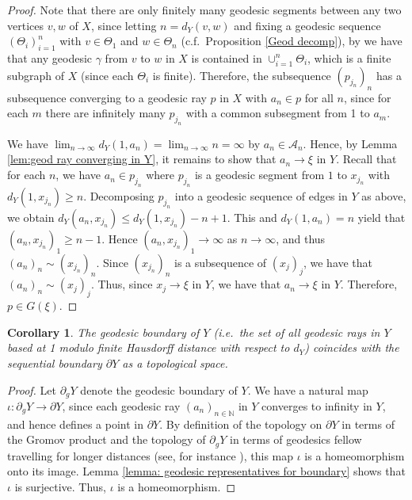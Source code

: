 \documentclass{article}[11pt]
\newtheorem{cor}[thm]{Corollary}
\newcommand{\N}{\mathbb{N}}
\begin{document}
{\begin{proof}
    Note that there are only finitely many geodesic segments between any two vertices $v,w$ of $X$, since letting $n = d_Y(v,w)$ and fixing a geodesic sequence $(\Theta_i)_{i=1}^n$ with $v \in \Theta_1$ and $w \in \Theta_n$ (c.f.\ Proposition \ref{Geod decomp}), by \cite[Remark 3.7]{Gruber_Sisto} we have that any geodesic $\gamma$ from $v$ to $w$ in $X$ is contained in $\cup_{i=1}^n \Theta_i$, which is a finite subgraph of $X$ (since each $\Theta_i$ is finite). Therefore, the subsequence $(p_{j_n})_n$ has a subsequence converging to a geodesic ray $p$ in $X$ with $a_n \in p$ for all $n$, since for each $m$ there are infinitely many $p_{j_n}$ with a common subsegment from 1 to $a_m$.
    
    We have $\lim_{n \to \infty}d_Y(1,a_n) = \lim_{n \to \infty}n = \infty$ by $a_n \in \mathcal{A}_n$. Hence, by Lemma \ref{lem:geod ray converging in Y}, it remains to show that $a_n \to \xi$ in $Y$. Recall that for each $n$, we have $a_n \in p_{j_n}$ where $p_{j_n}$ is a geodesic segment from $1$ to $x_{j_n}$ with $d_Y(1,x_{j_n}) \geq n$. Decomposing $p_{j_n}$ into a geodesic sequence of edges in $Y$ as above, we obtain $d_Y(a_n, x_{j_n}) \leq d_Y(1, x_{j_n}) - n + 1$. This and $d_Y(1,a_n)=n$ yield that $(a_n, x_{j_n})_1 \geq n-1$. 
    Hence $(a_n, x_{j_n})_1 \to \infty$ as $n \to \infty$, and thus $(a_n)_n \sim (x_{j_n})_n$. Since $(x_{j_n})_n$ is a subsequence of $(x_j)_j$, we have that $(a_n)_n \sim (x_j)_j$. Thus, since $x_j \to \xi$ in $Y$, we have that $a_n \to \xi$ in $Y$. Therefore, $p \in G(\xi)$.
\end{proof}

\begin{cor}
    \label{cor: Geodesic and seq boundaries same}
    The geodesic boundary of $Y$ (i.e.\ the set of all geodesic rays in $Y$ based at 1 modulo finite Hausdorff distance with respect to $d_Y$) coincides with the sequential boundary $\partial Y$ as a topological space.
\end{cor}

\begin{proof}
Let $\partial_g Y$ denote the geodesic boundary of $Y$. We have a natural map $\iota: \partial_g Y \to \partial Y$, since each geodesic ray $(a_n)_{n \in \N}$ in $Y$ converges to infinity in $Y$, and hence defines a point in $\partial Y$. By definition of the topology on $\partial Y$ in terms of the Gromov product and the topology of $\partial_g Y$ in terms of geodesics fellow travelling for longer distances (see, for instance \cite[Chapter III.H.3]{BH99}), this map $\iota$ is a homeomorphism onto its image. Lemma \ref{lemma: geodesic representatives for boundary} shows that $\iota$ is surjective. Thus, $\iota$ is a homeomorphism. 
\end{proof}

}
\end{document}
